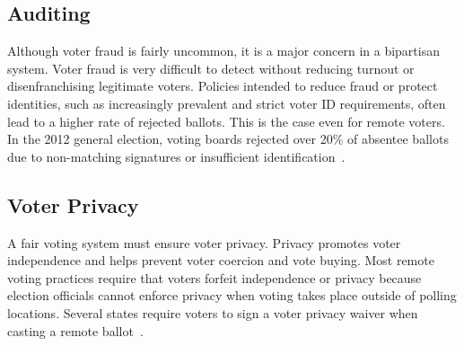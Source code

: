 \subsection{Auditing}

Although voter fraud is fairly uncommon, it is a major concern in a
bipartisan system. Voter fraud is very difficult to detect without
reducing turnout or disenfranchising legitimate voters. Policies
intended to reduce fraud or protect identities, such as increasingly
prevalent and strict voter ID requirements, often lead to a higher
rate of rejected ballots. This is the case even for remote voters. In
the 2012 general election, voting boards rejected over 20\% of
absentee ballots due to non-matching signatures or insufficient
identification~\cite{eac2012survey}.

\subsection{Voter Privacy}

A fair voting system must ensure voter privacy. Privacy promotes voter
independence and helps prevent voter coercion and vote buying. Most
remote voting practices require that voters forfeit independence or
privacy because election officials cannot enforce privacy when voting
takes place outside of polling locations. Several states require
voters to sign a voter privacy waiver when casting a remote
ballot~\cite{smithtime}.


